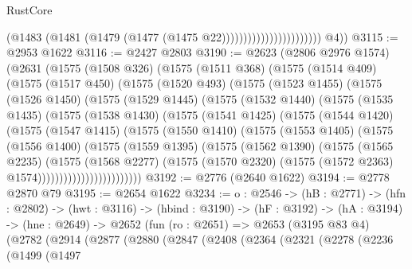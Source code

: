 \begin{lexlean}{RustCore}
\begin{coremodule}
                                            (@1483
                                              (@1481 (@1479 (@1477 (@1475 @22)))))))))))))))))))))))
        @4))
@3115 := @2953 @1622
@3116 := @2427 @2803
@3190 := @2623
    (@2806 @2976 @1574)
    (@2631
      (@1575
        (@1508 @326)
        (@1575
          (@1511 @368)
          (@1575
            (@1514 @409)
            (@1575
              (@1517 @450)
              (@1575
                (@1520 @493)
                (@1575
                  (@1523 @1455)
                  (@1575
                    (@1526 @1450)
                    (@1575
                      (@1529 @1445)
                      (@1575
                        (@1532 @1440)
                        (@1575
                          (@1535 @1435)
                          (@1575
                            (@1538 @1430)
                            (@1575
                              (@1541 @1425)
                              (@1575
                                (@1544 @1420)
                                (@1575
                                  (@1547 @1415)
                                  (@1575
                                    (@1550 @1410)
                                    (@1575
                                      (@1553 @1405)
                                      (@1575
                                        (@1556 @1400)
                                        (@1575
                                          (@1559 @1395)
                                          (@1575
                                            (@1562 @1390)
                                            (@1575
                                              (@1565 @2235)
                                              (@1575
                                                (@1568 @2277)
                                                (@1575
                                                  (@1570 @2320)
                                                  (@1575 (@1572 @2363) @1574))))))))))))))))))))))))
@3192 := @2776 (@2640 @1622)
@3194 := @2778 @2870 @79
@3195 := @2654 @1622
@3234 := {o : @2546} ->
  (hB : @2771) ->
  (hfn : @2802) ->
  (hwt : @3116) ->
  (hbind : @3190) ->
  (hF : @3192) ->
  (hA : @3194) ->
  (hne : @2649) ->
  @2652
    (fun (ro : @2651) =>
    @2653
      (@3195 @83 @4)
      (@2782
        (@2914
          (@2877
            (@2880
              (@2847
                (@2408
                  (@2364
                    (@2321
                      (@2278
                        (@2236
                          (@1499
                            (@1497

\end{coremodule}
\end{lexlean}
